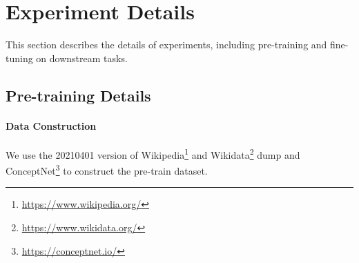 \documentclass[11pt]{article}
\begin{document}
\newpage
\appendix


\section{Experiment Details} \label{sec:experiment_data}

This section describes the details of experiments, including pre-training and fine-tuning on downstream tasks.

\subsection{Pre-training Details} \label{sec:pretrain_details}
\paragraph{Data Construction}
We use the 20210401 version of Wikipedia\footnote{\url{https://www.wikipedia.org/}} and Wikidata\footnote{\url{https://www.wikidata.org/}} dump and ConceptNet\footnote{\url{https://conceptnet.io/}} to construct the pre-train dataset.
\end{document}

